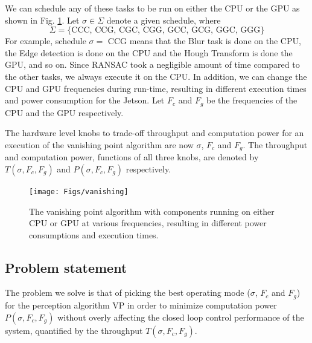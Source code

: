 We can schedule any of these tasks to be run on either the CPU or the GPU as shown in Fig. \ref{fig:vanishing}.
Let $\sigma \in \Sigma$ denote a given schedule, where 
\[\Sigma=\{\text{CCC, CCG, CGC, CGG, GCC, GCG, GGC, GGG}\} \]
For example, schedule $\sigma=$ CCG means that the Blur task is done on the CPU, the Edge detection is done on the CPU and the Hough Transform is done the GPU, and so on.
Since RANSAC took a negligible amount of time compared to the other tasks, we always execute it on the CPU.
In addition, we can change the CPU and GPU frequencies during run-time, resulting in different execution times and power consumption for the Jetson. 
Let $F_c$ and $F_g$ be the frequencies of the CPU and the GPU respectively. 

The hardware level knobs to trade-off throughput and computation power for an execution of the vanishing point algorithm are now $\sigma$, $F_c$ and $F_g$. 
The throughput and computation power, functions  of all three knobs, are denoted by $T(\sigma,F_c,F_g)$ and $P(\sigma,F_c,F_g)$ respectively.


\begin{figure}
	\centering
	\texttt{[image: Figs/vanishing]}
	\caption{The vanishing point algorithm with components running on either CPU or GPU at various frequencies, resulting in different power consumptions and execution times.}
	\label{fig:vanishing}		
\end{figure}

\subsection{Problem statement}
The problem we solve is that of picking the best operating mode ($\sigma$, $F_c$ and $F_g$) for the perception algorithm VP in order to minimize computation power $P(\sigma,F_c,F_g)$ without overly affecting the closed loop control performance of the system, quantified by the throughput $T(\sigma,F_c,F_g)$. 
